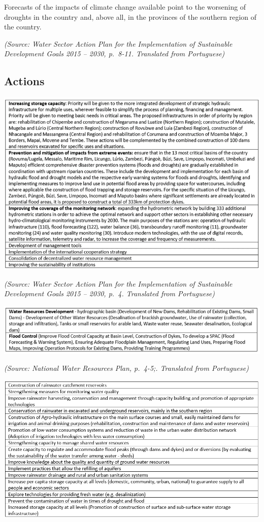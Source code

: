 \documentclass[
]{book}
\begin{document}
Forecasts of the impacts of climate change available point to the worsening of droughts in the country and, above all, in the provinces of the southern region of the country.

\emph{(Source: Water Sector Action Plan for the Implementation of Sustainable Development Goals 2015 -- 2030, p.~8-11. Translated from Portuguese)}

\hypertarget{actions-3}{%
\subsection{Actions}\label{actions-3}}

\includegraphics{Figure35.png}

\emph{(Source: Water Sector Action Plan for the Implementation of Sustainable Development Goals 2015 -- 2030, p.~4. Translated from Portuguese)}

\includegraphics{Figure36.png}

\emph{(Source: National Water Resources Plan, p.~4-5;. Translated from Portuguese)}

\includegraphics{Figure37.png}
\end{document}
